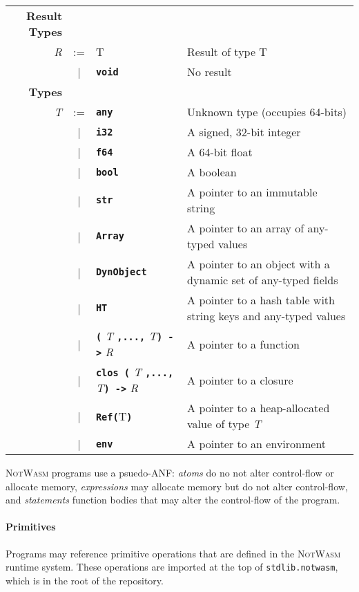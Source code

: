 \documentclass{book}
\newcommand{\notwasm}{\textsc{NotWasm}\xspace}
\newcommand{\kw}[1]{\textbf{\texttt{#1}}}
\newcommand{\metavar}[1]{\textit{#1}}
\begin{document}
\begin{tabular}{rcll}
\textbf{Result Types} \\
\metavar{R} & := & T 
            & \textrm{Result of type T} \\
            & |  & \kw{void}
            & \textrm{No result} \\
\textbf{Types} \\
\metavar{T} & := & \kw{any} 
         & Unknown type (occupies 64-bits) \\
    & |  & \kw{i32} 
         & A signed, 32-bit integer \\
    & |  & \kw{f64} 
         & A 64-bit float \\
    & |  & \kw{bool} 
         & A boolean \\
    & |  & \kw{str} 
         & A pointer to an immutable string \\
    & |  & \kw{Array}
         & A pointer to an array of any-typed values \\
    & |  & \kw{DynObject} 
         & A pointer to an object with a dynamic set of any-typed fields \\
    & |  & \kw{HT}
         & A pointer to a hash table with string keys and any-typed values \\
    & |  & \kw{(} \metavar{T} \kw{,...,} \metavar{T}\kw{) ->} \metavar{R}
         & A pointer to a function \\
    & |  & \kw{clos (} \metavar{T} \kw{,...,} \metavar{T}\kw{) ->} \metavar{R}
         & A pointer to a closure \\
    & |  & \kw{Ref(}T\kw{)}
         & A pointer to a heap-allocated value of type \metavar{T} \\
    & |  & \kw{env}
         & A pointer to an environment \\
\end{tabular}

\notwasm programs use a psuedo-ANF: \emph{atoms} do no not alter control-flow
or allocate memory, \emph{expressions} may allocate memory but do not alter
control-flow, and \emph{statements} function bodies that may alter the
control-flow of the program.

\paragraph{Primitives} Programs may reference primitive operations that are
defined in the \notwasm runtime system. These operations are imported at the
top of \texttt{stdlib.notwasm}, which is in the root of the repository.
\end{document}
